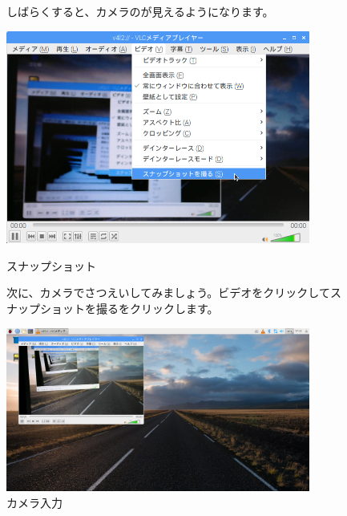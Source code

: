 \begin{figure}[ht]



  \flushleft
  しばらくすると、カメラのが見えるようになります。

  \centering
  \begin{minipage}{10cm}
    {\upshape
      \includegraphics[width=10cm]{text01-img/textbook-img118.png}
      \caption{スナップショット}
    }
  \end{minipage}

  \flushleft
  次に、カメラでさつえいしてみましょう。ビデオをクリックしてスナップショットを撮るをクリックします。


  \centering
  \begin{minipage}{10cm}
    \includegraphics[width=10cm]{text01-img/textbook-img119.png}
    {\upshape
      \caption{カメラ入力}
    }
  \end{minipage}


\end{figure}

